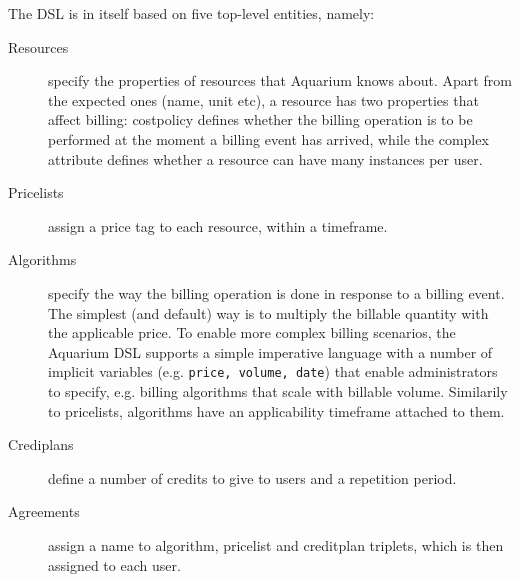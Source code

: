 \documentclass[preprint,10pt]{sigplanconf}
\begin{document}
The DSL is in itself based on five top-level entities, namely:

\begin{description}

    \item[Resources] specify the properties of resources that Aquarium knows
        about. Apart from the expected ones (name, unit etc), 
        a resource has two properties that affect billing: \textsf{costpolicy}
        defines whether the billing operation is to be performed at the moment
        a billing event has arrived, while the \textsf{complex} attribute defines
        whether a resource can have many instances per user.

    \item[Pricelists] assign a price tag to each resource, within a timeframe.
    
    \item[Algorithms] specify the way the billing operation is done in response
        to a billing event. The simplest (and default) way is to multiply the 
        billable quantity with the applicable price. To enable more complex billing
        scenarios, the Aquarium DSL supports a simple imperative language with
        a number of implicit variables (e.g. \texttt{price, volume, date}) 
        that enable administrators to specify, e.g. billing algorithms that
        scale with billable volume. Similarily to pricelists, algorithms
        have an applicability timeframe attached to them.

    \item[Crediplans] define a number of credits to give to users and a repetition
        period.

    \item[Agreements] assign a name to algorithm, pricelist and creditplan triplets,
        which is then assigned to each user.

\end{description}
\end{document}
